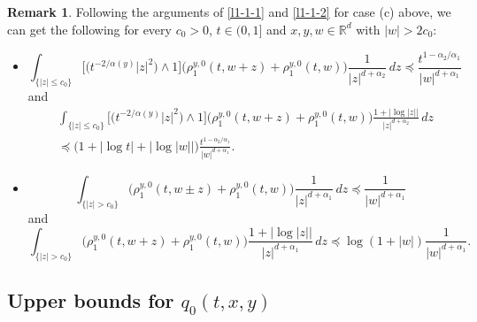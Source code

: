 \documentclass[a4paper,11pt]{amsart}
\renewcommand{\le}{\leqslant}
\newcommand{\R}{\mathds R}
\newcommand{\p}{\preceq}
\newcommand{\A}{\alpha}
\theoremstyle{definition}
\newtheorem{remark}[theorem]{Remark}
\begin{document}
\begin{remark}\label{r-1}
Following the arguments of \eqref{l1-1-1} and \eqref{l1-1-2} for case (c) above, we can get the following
 for every $c_0>0$,
$t \in (0,1]$ and $x,y,w \in \R^d$ with $|w|>2c_0$:
\begin{itemize}
\item[(i)] \begin{equation}\label{r1-1-1a}
\int_{\{|z|\le c_0\}}\big[\big(t^{-{2}/{\A(y)}} |z|^2\big)\wedge 1\big]
\big(
\rho_1^{y,0}(t,w{+} z)
+\rho_1^{y,0}(t,w)\big)\frac{1}{|z|^{d+\A_2}}\,dz\p \frac{t^{1-\A_2/\A_1}}{|w|^{d+\A_1}}
\end{equation} and
\begin{equation}\label{r1-1-2a}
\begin{split}
&\int_{\{|z|\le c_0\}}\big[\big(t^{-{2}/{\A(y)}} |z|^2\big)\wedge 1\big]
\big(
\rho_1^{y,0}(t,w + z)
+\rho_1^{y,0}(t,w)\big)\frac{1+|\log|z||}{|z|^{d+\A_2}}\,dz\\
&\p
\big(1+|\log t|+|\log|w||\big)\frac{t^{1-\A_2/\A_1}}{|w|^{d+\A_1}}.
\end{split}
\end{equation}

\item[(ii)]
\begin{equation}\label{r1-1-1}
\int_{\{|z|>c_0\}}\big(\rho^{y,0}_1(t,w\pm z)+\rho^{y,0}_1(t,w)\big)\frac{1}{|z|^{d+\A_1}}\,dz\p \frac 1{|w|^{d+\A_1}}
\end{equation}
 and
\begin{equation}\label{r1-1-2}
\int_{\{|z|>c_0\}}\big(\rho^{y,0}_1(t,w{+} z)+\rho^{y,0}_1(t,w)\big)\frac{1+|\log|z||}{|z|^{d+\A_1}}\,dz\p
\log(1+|w|)\frac 1{|w|^{d+\A_1}}.
\end{equation}
\end{itemize}
\end{remark}


\medskip

\subsection{Upper bounds for $q_0(t,x,y)$}
\end{document}
